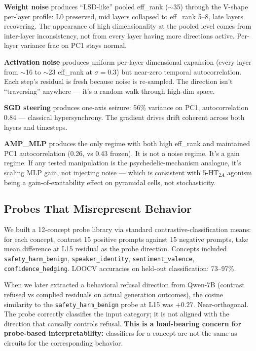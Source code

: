 \documentclass[11pt,a4paper]{article}
\begin{document}
\textbf{Weight noise} produces ``LSD-like'' pooled eff\_rank ($\sim$35) through the V-shape per-layer profile: L0 preserved, mid layers collapsed to eff\_rank 5--8, late layers recovering. The appearance of high dimensionality at the pooled level comes from inter-layer inconsistency, not from every layer having more directions active. Per-layer variance frac on PC1 stays normal.

\textbf{Activation noise} produces uniform per-layer dimensional expansion (every layer from $\sim$16 to $\sim$23 eff\_rank at $\sigma=0.3$) but near-zero temporal autocorrelation. Each step's residual is fresh because noise is re-sampled. The direction isn't ``traversing'' anywhere --- it's a random walk through high-dim space.

\textbf{SGD steering} produces one-axis seizure: 56\% variance on PC1, autocorrelation 0.84 --- classical hypersynchrony. The gradient drives drift coherent across both layers and timesteps.

\textbf{AMP\_MLP} produces the only regime with both high eff\_rank and maintained PC1 autocorrelation (0.26, vs 0.43 frozen). It is not a noise regime. It's a gain regime. If any tested manipulation is the psychedelic-mechanism analogue, it's scaling MLP gain, not injecting noise --- which is consistent with 5-HT$_{2A}$ agonism being a gain-of-excitability effect on pyramidal cells, not stochasticity.

\subsection{Probes That Misrepresent Behavior}

We built a 12-concept probe library via standard contrastive-classification means: for each concept, contrast 15 positive prompts against 15 negative prompts, take mean difference at L15 residual as the probe direction. Concepts included \texttt{safety\_harm\_benign}, \texttt{speaker\_identity}, \texttt{sentiment\_valence}, \texttt{confidence\_hedging}. LOOCV accuracies on held-out classification: 73--97\%.

When we later extracted a behavioral refusal direction from Qwen-7B (contrast refused vs complied residuals on actual generation outcomes), the cosine similarity to the \texttt{safety\_harm\_benign} probe at L15 was $+0.27$. Near-orthogonal. The probe correctly classifies the input category; it is not aligned with the direction that causally controls refusal. \textbf{This is a load-bearing concern for probe-based interpretability:} classifiers for a concept are not the same as circuits for the corresponding behavior.
\end{document}
